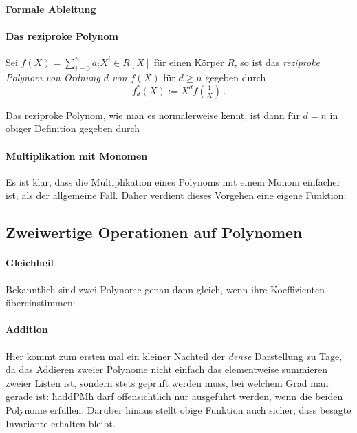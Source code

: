 \paragraph{Formale Ableitung} 

\paragraph{Das reziproke Polynom} 
\begin{definition}
  \label{def:reziprokesPoly}
  Sei $f(X) = \sum_{i=0}^n a_i X^i \in R[X]$ für einen Körper $R$, so ist 
  das \emph{reziproke Polynom von Ordnung $d$ von $f(X)$} für $d \geq n$ 
  gegeben durch
  \[ f^\ast_d(X) := X^d f(\tfrac{1}{X})\,.\]
\end{definition}


Das reziproke Polynom, wie man es normalerweise kennt, ist dann für $d=n$ in
obiger Definition gegeben durch



\paragraph{Multiplikation mit Monomen}
Es ist klar, dass die Multiplikation eines Polynoms mit einem Monom einfacher
ist, als der allgemeine Fall. Daher verdient dieses Vorgehen eine eigene
Funktion:





\subsection{Zweiwertige Operationen auf Polynomen}
\paragraph{Gleichheit} Bekanntlich sind zwei Polynome 
genau dann gleich, wenn ihre Koeffizienten übereinstimmen:


\paragraph{Addition} Hier kommt zum ersten mal ein kleiner Nachteil der
\emph{dense} Darstellung zu Tage, da das Addieren zweier Polynome nicht einfach
das elementweise summieren zweier Listen ist, sondern stets geprüft werden
muss, bei welchem Grad man gerade ist:
ħaddPMħ darf offensichtlich nur ausgeführt werden, wenn die beiden Polynome
 erfüllen. Darüber hinaus stellt obige Funktion auch sicher,
dass besagte Invariante erhalten bleibt.

